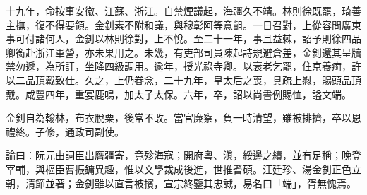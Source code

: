 \begin{pinyinscope}
十九年，命按事安徽、江蘇、浙江。自禁煙議起，海疆久不靖。林則徐既罷，琦善主撫，復不得要領。金釗素不附和議，與穆彰阿等意齟。一日召對，上從容問廣東事可付諸何人，金釗以林則徐對，上不悅。至二十一年，事且益棘，詔予則徐四品卿銜赴浙江軍營，亦未果用之。未幾，有吏部司員陳起詩規避倉差，金釗還其呈牘禁勿遞，為所訐，坐降四級調用。逾年，授光祿寺卿。以衰老乞罷，住京養痾，許以二品頂戴致仕。久之，上仍眷念，二十九年，皇太后之喪，具疏上慰，賜頭品頂戴。咸豐四年，重宴鹿鳴，加太子太保。六年，卒，詔以尚書例賜恤，謚文端。

金釗自為翰林，布衣脫粟，後常不改。當官廉察，負一時清望，雖被排擠，卒以恩禮終。子修，通政司副使。

論曰：阮元由詞臣出膺疆寄，竟殄海寇；開府粵、滇，綏邊之績，並有足稱；晚登宰輔，與樞臣曹振鏞異趣，惟以文學裁成後進，世推耆碩。汪廷珍、湯金釗正色立朝，清節並著；金釗雖以直言被擯，宣宗終鑒其忠誠，易名曰「端」，胥無愧焉。


\end{pinyinscope}